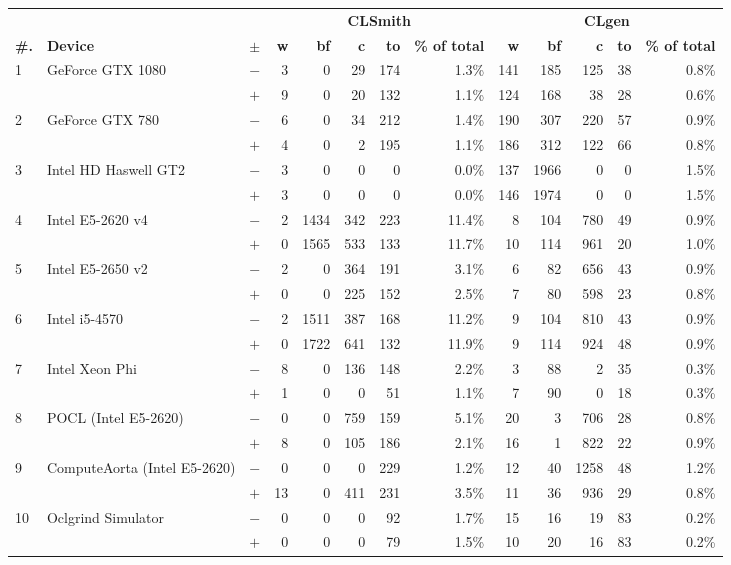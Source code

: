   \begin{tabular}{lll | rrrrr | rrrrr }
  \toprule
  & & & \multicolumn{5}{c|}{\textbf{CLSmith}} & \multicolumn{5}{c}{\textbf{CLgen}} \\
  \textbf{\#.} & \textbf{Device} & $\pm$ &
  \textbf{w} & \textbf{bf} & \textbf{c} & \textbf{to} & \textbf{\% of total} &
  \textbf{w} & \textbf{bf} & \textbf{c} & \textbf{to} & \textbf{\% of total} \\
  \midrule
  \multirow{ 2}{*}{1} & \multirow{ 2}{*}{GeForce GTX 1080} & $-$ & 3 & 0 & 29 & 174 & 1.3\%       & 141 & 185 & 125 & 38 & 0.8\% \\& & $+$ & 9 & 0 & 20 & 132 & 1.1\% & 124 & 168 & 38 & 28 & 0.6\% \\
\hline
\multirow{ 2}{*}{2} & \multirow{ 2}{*}{GeForce GTX 780} & $-$ & 6 & 0 & 34 & 212 & 1.4\%       & 190 & 307 & 220 & 57 & 0.9\% \\& & $+$ & 4 & 0 & 2 & 195 & 1.1\% & 186 & 312 & 122 & 66 & 0.8\% \\
\hline
\multirow{ 2}{*}{3} & \multirow{ 2}{*}{Intel HD Haswell GT2} & $-$ & 3 & 0 & 0 & 0 & 0.0\%       & 137 & 1966 & 0 & 0 & 1.5\% \\& & $+$ & 3 & 0 & 0 & 0 & 0.0\% & 146 & 1974 & 0 & 0 & 1.5\% \\
\hline
\multirow{ 2}{*}{4} & \multirow{ 2}{*}{Intel E5-2620 v4} & $-$ & 2 & 1434 & 342 & 223 & 11.4\%       & 8 & 104 & 780 & 49 & 0.9\% \\& & $+$ & 0 & 1565 & 533 & 133 & 11.7\% & 10 & 114 & 961 & 20 & 1.0\% \\
\hline
\multirow{ 2}{*}{5} & \multirow{ 2}{*}{Intel E5-2650 v2} & $-$ & 2 & 0 & 364 & 191 & 3.1\%       & 6 & 82 & 656 & 43 & 0.9\% \\& & $+$ & 0 & 0 & 225 & 152 & 2.5\% & 7 & 80 & 598 & 23 & 0.8\% \\
\hline
\multirow{ 2}{*}{6} & \multirow{ 2}{*}{Intel i5-4570} & $-$ & 2 & 1511 & 387 & 168 & 11.2\%       & 9 & 104 & 810 & 43 & 0.9\% \\& & $+$ & 0 & 1722 & 641 & 132 & 11.9\% & 9 & 114 & 924 & 48 & 0.9\% \\
\hline
\multirow{ 2}{*}{7} & \multirow{ 2}{*}{Intel Xeon Phi} & $-$ & 8 & 0 & 136 & 148 & 2.2\%       & 3 & 88 & 2 & 35 & 0.3\% \\& & $+$ & 1 & 0 & 0 & 51 & 1.1\% & 7 & 90 & 0 & 18 & 0.3\% \\
\hline
\multirow{ 2}{*}{8} & \multirow{ 2}{*}{POCL (Intel E5-2620)} & $-$ & 0 & 0 & 759 & 159 & 5.1\%       & 20 & 3 & 706 & 28 & 0.8\% \\& & $+$ & 8 & 0 & 105 & 186 & 2.1\% & 16 & 1 & 822 & 22 & 0.9\% \\
\hline
\multirow{ 2}{*}{9} & \multirow{ 2}{*}{ComputeAorta (Intel E5-2620)} & $-$ & 0 & 0 & 0 & 229 & 1.2\%       & 12 & 40 & 1258 & 48 & 1.2\% \\& & $+$ & 13 & 0 & 411 & 231 & 3.5\% & 11 & 36 & 936 & 29 & 0.8\% \\
\hline
\multirow{ 2}{*}{10} & \multirow{ 2}{*}{Oclgrind Simulator} & $-$ & 0 & 0 & 0 & 92 & 1.7\%       & 15 & 16 & 19 & 83 & 0.2\% \\& & $+$ & 0 & 0 & 0 & 79 & 1.5\% & 10 & 20 & 16 & 83 & 0.2\% \\
  \bottomrule
\end{tabular}
